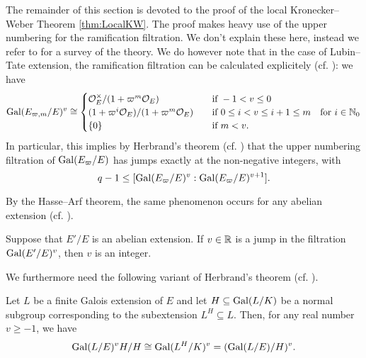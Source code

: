 \documentclass[../main.tex]{subfiles}
\begin{document}
The remainder of this section is devoted to the proof of the local Kronecker--Weber 
Theorem \ref{thm:LocalKW}.
The proof makes heavy use of the upper numbering for the ramification filtration.
We don't explain these here, instead we refer to \cite[Chapter
IV]{serre2013local} for a survey of the theory. We
do however note that in the case of Lubin--Tate extension, the 
ramification filtration can be calculated explicitely (cf. \cite[Theorem
2]{gold1981local}): we have
\begin{equation}\label{eq:CalculationOfUpperRamificationFiltration}
  \operatorname{Gal}(E_{\varpi, m}/E)^v \cong \begin{cases}
    \mathcal{O}_E^\times/(1 + \varpi^m \mathcal{O}_E) \quad &\text{if } -1 < v \leq 0 \\
    (1 + \varpi^i \mathcal{O}_E)/(1+\varpi^m \mathcal{O}_E) \quad &\text{if } 0 \leq i < v \leq i+1
    \leq m 
    \quad \text{for } i \in \mathbb{N}_0 \\
    \{0\} \quad &\text{if } m < v.
  \end{cases}
\end{equation}
In particular, this implies by Herbrand's theorem (cf. \cite[Ch. 4, Proposition
14]{serre2013local}) that the upper numbering filtration of 
$\operatorname{Gal}(E_\varpi/E)$ has jumps exactly at the non-negative integers, with
\begin{equation*}
  q-1 \leq [\operatorname{Gal}(E_\varpi/E)^{v} : \operatorname{Gal}(E_\varpi/E)^{v+1}].
\end{equation*}

By the Hasse--Arf theorem, the same phenomenon occurs for any abelian extension 
(cf. \cite{arf1940untersuchungen}).
\begin{thm}\label{thm:Hasse--Arf}
  Suppose that $E'/E$ is an abelian extension. If $v \in \mathbb{R}$ is a jump in the 
  filtration $\operatorname{Gal}(E'/E)^v$, then $v$ is an integer.
\end{thm}

We furthermore need the following variant of Herbrand's theorem (cf. \cite[Chapter IV,
Proposition 14]{serre2013local}).
\begin{thm}\label{prop:HerbrandsThm}
  Let $L$ be a finite Galois extension of $E$ and let $H \subseteq \operatorname{Gal}(L/K)$ be a
  normal subgroup
  corresponding to the subextension $L^H \subseteq L$. Then, for any real number $v \geq -1$, 
  we have
  \begin{equation*}
    \operatorname{Gal}(L/E)^v H / H \cong \operatorname{Gal}(L^H/K)^v = (\operatorname{Gal}(L/E)/H)^v.
  \end{equation*}
\end{thm}
\end{document}

